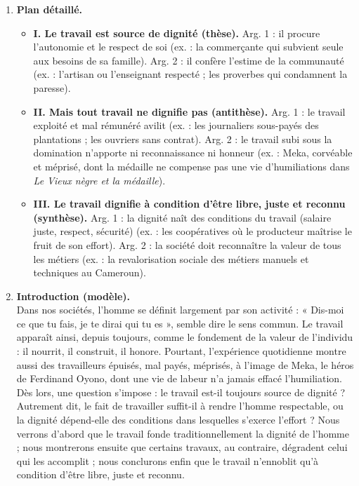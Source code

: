 \documentclass[11pt]{article}
\begin{document}
\begin{corrige}
\begin{enumerate}
\begin{itemize}
\item Meka a travaillé toute sa vie sans être respecté par l'administration coloniale (ex. : \emph{Le Vieux nègre et la médaille}) ;
\item Le travail librement choisi et justement rémunéré dignifie (ex. : les coopératives agricoles de l'Ouest) ;
\item La dignité dépend des conditions, non du seul fait de travailler (ex. : luttes ouvrières pour de meilleurs salaires).
\end{itemize}
\item \textbf{Plan détaillé.}
\begin{itemize}
\item \textbf{I. Le travail est source de dignité (thèse).} Arg. 1 : il procure l'autonomie et le respect de soi (ex. : la commerçante qui subvient seule aux besoins de sa famille). Arg. 2 : il confère l'estime de la communauté (ex. : l'artisan ou l'enseignant respecté ; les proverbes qui condamnent la paresse).
\item \textbf{II. Mais tout travail ne dignifie pas (antithèse).} Arg. 1 : le travail exploité et mal rémunéré avilit (ex. : les journaliers sous-payés des plantations ; les ouvriers sans contrat). Arg. 2 : le travail subi sous la domination n'apporte ni reconnaissance ni honneur (ex. : Meka, corvéable et méprisé, dont la médaille ne compense pas une vie d'humiliations dans \emph{Le Vieux nègre et la médaille}).
\item \textbf{III. Le travail dignifie à condition d'être libre, juste et reconnu (synthèse).} Arg. 1 : la dignité naît des conditions du travail (salaire juste, respect, sécurité) (ex. : les coopératives où le producteur maîtrise le fruit de son effort). Arg. 2 : la société doit reconnaître la valeur de tous les métiers (ex. : la revalorisation sociale des métiers manuels et techniques au Cameroun).
\end{itemize}
\item \textbf{Introduction (modèle).} \\
Dans nos sociétés, l'homme se définit largement par son activité : « Dis-moi ce que tu fais, je te dirai qui tu es », semble dire le sens commun. Le travail apparaît ainsi, depuis toujours, comme le fondement de la valeur de l'individu : il nourrit, il construit, il honore. Pourtant, l'expérience quotidienne montre aussi des travailleurs épuisés, mal payés, méprisés, à l'image de Meka, le héros de Ferdinand Oyono, dont une vie de labeur n'a jamais effacé l'humiliation. Dès lors, une question s'impose : le travail est-il toujours source de dignité ? Autrement dit, le fait de travailler suffit-il à rendre l'homme respectable, ou la dignité dépend-elle des conditions dans lesquelles s'exerce l'effort ? Nous verrons d'abord que le travail fonde traditionnellement la dignité de l'homme ; nous montrerons ensuite que certains travaux, au contraire, dégradent celui qui les accomplit ; nous conclurons enfin que le travail n'ennoblit qu'à condition d'être libre, juste et reconnu.
\end{enumerate}


\end{corrige}
\end{document}

